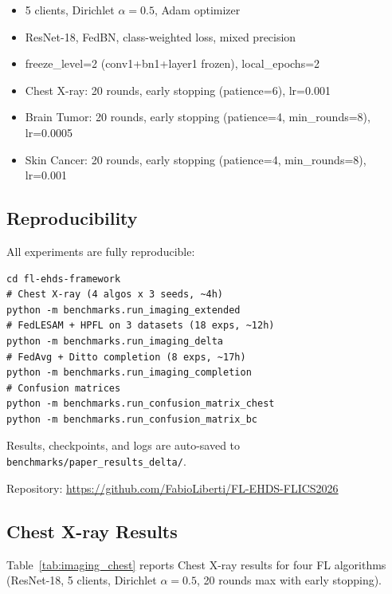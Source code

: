 \documentclass[conference]{IEEEtran}
\begin{document}
\begin{itemize}
    \item 5 clients, Dirichlet $\alpha{=}0.5$, Adam optimizer
    \item ResNet-18, FedBN, class-weighted loss, mixed precision
    \item freeze\_level=2 (conv1+bn1+layer1 frozen), local\_epochs=2
    \item Chest X-ray: 20 rounds, early stopping (patience=6), lr=0.001
    \item Brain Tumor: 20 rounds, early stopping (patience=4, min\_rounds=8), lr=0.0005
    \item Skin Cancer: 20 rounds, early stopping (patience=4, min\_rounds=8), lr=0.001
\end{itemize}

\subsection{Reproducibility}

All experiments are fully reproducible:
\begin{verbatim}
cd fl-ehds-framework
# Chest X-ray (4 algos x 3 seeds, ~4h)
python -m benchmarks.run_imaging_extended
# FedLESAM + HPFL on 3 datasets (18 exps, ~12h)
python -m benchmarks.run_imaging_delta
# FedAvg + Ditto completion (8 exps, ~17h)
python -m benchmarks.run_imaging_completion
# Confusion matrices
python -m benchmarks.run_confusion_matrix_chest
python -m benchmarks.run_confusion_matrix_bc
\end{verbatim}

Results, checkpoints, and logs are auto-saved to \texttt{benchmarks/paper\_results\_delta/}.

Repository: \url{https://github.com/FabioLiberti/FL-EHDS-FLICS2026}

\subsection{Chest X-ray Results}
\label{sec:imaging_results}

Table~\ref{tab:imaging_chest} reports Chest X-ray results for four FL algorithms (ResNet-18, 5 clients, Dirichlet $\alpha{=}0.5$, 20 rounds max with early stopping).
\end{document}
